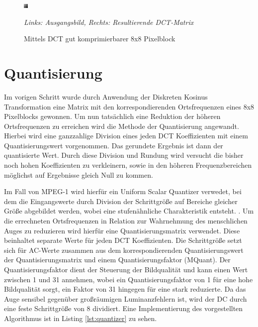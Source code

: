 \begin{figure}[h!]
    \centering
    \begin{multicols}{2}
    \includegraphics[scale=15]{images/2-2_dct_good.png}
    
    \end{multicols}
    \caption{Mittels DCT gut komprimierbarer 8x8 Pixelblock}
    \textit{Links: Ausgangsbild, Rechts: Resultierende DCT-Matrix}
    \label{fig:dct-good}
\end{figure}


\section{Quantisierung}

Im vorigen Schritt wurde durch Anwendung der Diskreten Kosinus Transformation eine Matrix mit den korrespondierenden Ortsfrequenzen eines 8x8 Pixelblocks gewonnen. Um nun tatsächlich eine Reduktion der höheren Ortsfrequenzen zu erreichen wird die Methode der Quantisierung angewandt. Hierbei wird eine ganzzahlige Division eines jeden DCT Koeffizienten mit einem Quantisierungswert vorgenommen. Das gerundete Ergebnis ist dann der quantisierte Wert. Durch diese Division und Rundung wird versucht die bisher noch hohen Koeffizienten zu verkleinern, sowie in den höheren Frequenzbereichen möglichst auf Ergebnisse gleich Null zu kommen.

Im Fall von MPEG-1 wird hierfür ein Uniform Scalar Quantizer verwedet, bei dem die Eingangswerte durch Division der Schrittgröße auf Bereiche gleicher Größe abgebildet werden, wobei eine stufenähnliche Charakteristik entsteht. \cite{symes_peter_digital_2004}. Um die errechneten Ortsfrequenzen in Relation zur Wahrnehmung des menschlichen Auges zu reduzieren wird hierfür eine Quantisierungsmatrix verwendet. Diese beinhaltet separate Werte für jeden DCT Koeffizienten. Die Schrittgröße setzt sich für AC-Werte zusammen aus dem korrespondierenden Quantisierungswert der Quantisierungsmatrix und einem Quantisierungsfaktor (MQuant). Der Quantisierungsfaktor dient der Steuerung der Bildqualität und kann einen Wert zwischen 1 und 31 annehmen, wobei ein Quantisierungsfaktor von 1 für eine hohe Bildqualität sorgt, ein Faktor von 31 hingegen für eine stark reduzierte. Da das Auge sensibel gegenüber großräumigen Luminanzfehlern ist, wird der DC durch eine feste Schrittgröße von 8 dividiert. \cite{ISO13586} Eine Implementierung des vorgestellten Algorithmus ist in Listing \ref{lst:quantizer} zu sehen.

